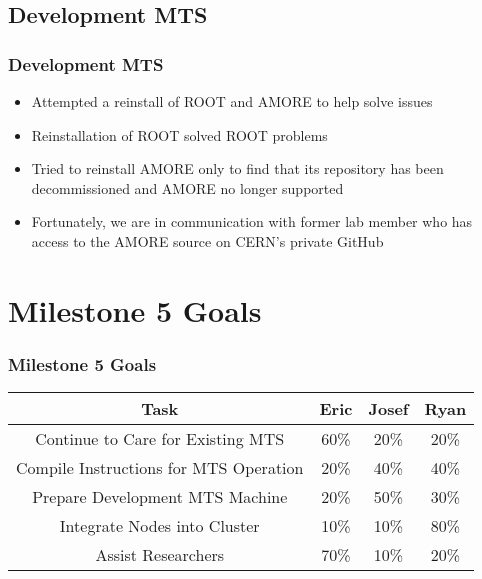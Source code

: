 \documentclass[aspectratio=169]{beamer}
\begin{document}


\subsection{Development MTS}

\begin{frame}

  \frametitle{Development MTS}

  \begin{itemize}
    \item Attempted a reinstall of ROOT and AMORE to help solve issues
    \item Reinstallation of ROOT solved ROOT problems
    \item Tried to reinstall AMORE only to find that its repository has been
      decommissioned and AMORE no longer supported
    \item Fortunately, we are in communication with former lab member who has
      access to the AMORE source on CERN's private GitHub
  \end{itemize}


\end{frame}




\section{Milestone 5 Goals}

\begin{frame}

  \frametitle{Milestone 5 Goals}

  \begin{center}
  \begin{tabular}{|c|c|c|c|}
    \hline
    Task & Eric & Josef & Ryan \\
    \hline
    Continue to Care for Existing MTS & 60\% & 20\% & 20\% \\
    Compile Instructions for MTS Operation & 20\% & 40\% & 40\% \\
    Prepare Development MTS Machine & 20\% & 50\% & 30\% \\
    Integrate Nodes into Cluster & 10\% & 10\% & 80\% \\
    Assist Researchers & 70\% & 10\% & 20\% \\
    \hline
  \end{tabular}
\end{center}

\end{frame}
\end{document}
